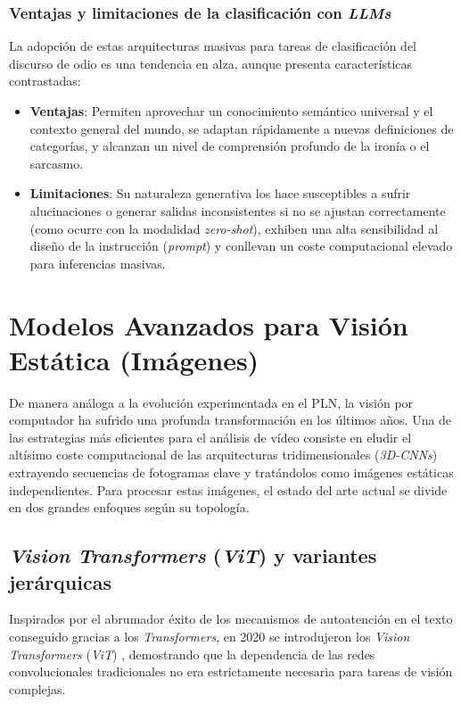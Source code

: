 \subsubsection*{Ventajas y limitaciones de la clasificación con \textit{LLMs}}
\label{subsubsec:VentajasYLimitacionesLLMs}
La adopción de estas arquitecturas masivas para tareas de clasificación del discurso de odio es una tendencia en alza, aunque presenta características contrastadas: 
\begin{itemize}
    \item \textbf{Ventajas}: Permiten aprovechar un conocimiento semántico universal y el contexto general del mundo, se adaptan rápidamente a nuevas definiciones de categorías, y alcanzan un nivel de comprensión profundo de la ironía o el sarcasmo. 
    \item \textbf{Limitaciones}: Su naturaleza generativa los hace susceptibles a sufrir alucinaciones o generar salidas inconsistentes si no se ajustan correctamente (como ocurre con la modalidad \textit{zero-shot}), exhiben una alta sensibilidad al diseño de la instrucción (\textit{prompt}) y conllevan un coste computacional elevado para inferencias masivas.
\end{itemize}

\section{Modelos Avanzados para Visión Estática (Imágenes)}
\label{sec:ModelosAvanzadosParaVisionEstatica}
De manera análoga a la evolución experimentada en el PLN, la visión por computador ha sufrido una profunda transformación en los últimos años. Una de las estrategias más eficientes para el análisis de vídeo consiste en eludir el altísimo coste computacional de las arquitecturas tridimensionales (\textit{3D-CNNs}) \cite{carreira2017quo} extrayendo secuencias de fotogramas clave y tratándolos como imágenes estáticas independientes. Para procesar estas imágenes, el estado del arte actual se divide en dos grandes enfoques según su topología.

\subsection{\textit{Vision Transformers} (\textit{ViT}) y variantes jerárquicas}
\label{subsec:ViT}
Inspirados por el abrumador éxito de los mecanismos de autoatención en el texto conseguido gracias a los \textit{Transformers}, en 2020 se introdujeron los \textit{Vision Transformers} (\textit{ViT}) \cite{dosovitskiy2020image}, demostrando que la dependencia de las redes convolucionales tradicionales no era estrictamente necesaria para tareas de visión complejas. 

